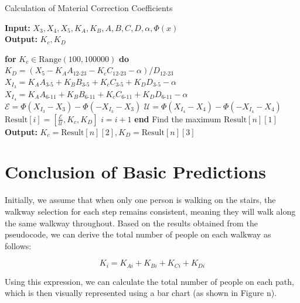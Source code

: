 \documentclass{mcmthesis}
\begin{document}
\renewcommand{\algorithmicrequire}{\textbf{Input:}}
\renewcommand{\algorithmicensure}{\textbf{Output:}}

\begin{algorithm}
\caption{Calculation of Material Correction Coefficients}
\textbf{Input:} $X_3, X_4, X_5, K_A, K_B, A, B, C, D, \alpha, \Phi(x)$\\
\textbf{Output:} $K_c, K_D$
\begin{algorithmic}
\State \textbf{for} $K_c \in \text{Range}(100, 100000)$ \textbf{do}
    \State \hspace{1em} $K_D = (X_5 - K_A A_{12\text{-}23} - K_c C_{12\text{-}23} - \alpha) / D_{12\text{-}23} $
    \State \hspace{1em} $X_{I_3} = K_A A_{3\text{-}5} + K_B B_{3\text{-}5} + K_c C_{3\text{-}5} + K_D D_{3\text{-}5} - \alpha$
    \State \hspace{1em} $X_{I_4} = K_A A_{6\text{-}11} + K_B B_{6\text{-}11} + K_c C_{6\text{-}11} + K_D D_{6\text{-}11} - \alpha$
    \State \hspace{1em} $\mathcal{E} = \Phi(X_{I_3} - X_3) - \Phi(-X_{I_3} - X_3)$
    \State \hspace{1em} $\mathcal{U} = \Phi(X_{I_4} - X_4) - \Phi(-X_{I_4} - X_4)$
    \State \hspace{1em} $\text{Result}[i] = \left[ \frac{\mathcal{E}}{\mathcal{U}}, K_c, K_D \right]$
    \State \hspace{1em} $i = i + 1$
\State \textbf{end}
\State Find the maximum $\text{Result}[n][1]$
\State \textbf{Output:} $K_c = \text{Result}[n][2], K_D = \text{Result}[n][3]$
\end{algorithmic}
\end{algorithm}

\section{Conclusion of Basic Predictions}



Initially, we assume that when only one person is walking on the stairs, the walkway selection for each step remains consistent, meaning they will walk along the same walkway throughout. Based on the results obtained from the pseudocode, we can derive the total number of people on each walkway as follows:

\[ K_i = K_{Ai} + K_{Bi} + K_{Ci} + K_{Di} \]

Using this expression, we can calculate the total number of people on each path, which is then visually represented using a bar chart (as shown in Figure n).
\end{document}
